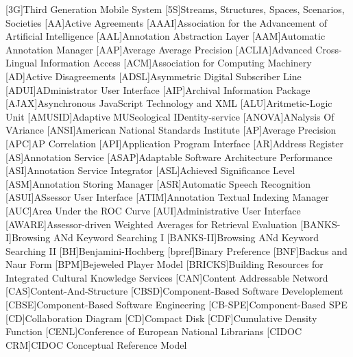 [3G]{Third Generation Mobile System}
[5S]{Streams, Structures, Spaces, Scenarios, Societies}
[AA]{Active Agreements}
[AAAI]{Association for the Advancement of Artificial Intelligence}
[AAL]{Annotation Abstraction Layer}
[AAM]{Automatic Annotation Manager}
[AAP]{Average Average Precision}
[ACLIA]{Advanced Cross-Lingual Information Access}
[ACM]{Association for Computing Machinery}
[AD]{Active Disagreements}
[ADSL]{Asymmetric Digital Subscriber Line}
[ADUI]{ADministrator User Interface}
[AIP]{Archival Information Package}
[AJAX]{Asynchronous JavaScript Technology and \acs{XML}}
[ALU]{Aritmetic-Logic Unit}
[AMUSID]{Adaptive MUSeological IDentity-service}
[ANOVA]{ANalysis Of VAriance}
[ANSI]{American National Standards Institute}
[AP]{Average Precision}
[APC]{AP Correlation}
[API]{Application Program Interface}
[AR]{Address Register}
[AS]{Annotation Service}
[ASAP]{Adaptable Software Architecture Performance}
[ASI]{Annotation Service Integrator}
[ASL]{Achieved Significance Level}
[ASM]{Annotation Storing Manager}
[ASR]{Automatic Speech Recognition}
[ASUI]{ASsessor User Interface}
[ATIM]{Annotation Textual Indexing Manager}
[AUC]{Area Under the ROC Curve}
[AUI]{Administrative User Interface}
[AWARE]{Assessor-driven Weighted Averages for Retrieval Evaluation}
[BANKS-I]{Browsing ANd Keyword Searching I}
[BANKS-II]{Browsing ANd Keyword Searching II}
[BH]{Benjamini-Hochberg}
[bpref]{Binary Preference}
[BNF]{Backus and Naur Form}
[BPM]{Bejeweled Player Model}
[BRICKS]{Building Resources for Integrated Cultural Knowledge Services}
[CAN]{Content Addressable Netword}
[CAS]{Content-And-Structure}
[CBSD]{Component-Based Software Developlement}
[CBSE]{Component-Based Software Engineering}
[CB-SPE]{Component-Based \acs{SPE}}
[CD]{Collaboration Diagram}
[CD]{Compact Disk}
[CDF]{Cumulative Density Function}
[CENL]{Conference of European National Librarians}
[CIDOC CRM]{CIDOC Conceptual Reference Model}
